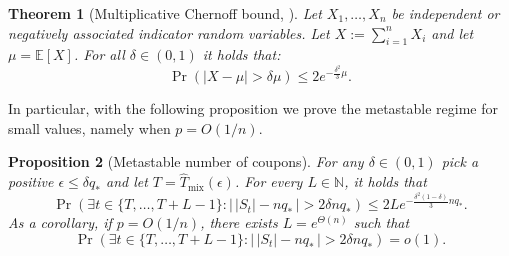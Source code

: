 \documentclass[11pt,a4paper]{article}
\newtheorem{theorem}{Theorem}
\newtheorem{proposition}[theorem]{Proposition}
\newcommand{\E}{\mathbb{E}}
\newcommand{\Tmar}{\hat{T}_{\mathrm{mix}}}
\begin{document}
\begin{theorem}[Multiplicative Chernoff bound, \cite{dubhashi2009concentration}]\label{thm:chernoff bound}
Let $X_1,\dots,X_n$ be independent or negatively associated indicator random variables. 
Let $X := \sum_{i=1}^{n} X_i$ and let $\mu = \E[X]$.
For all $\delta \in (0,1)$ it holds that:
\begin{equation*}
    \Pr(|X - \mu| > \delta\mu) \le 2e^{-\frac{\delta^2}{3}\mu}.
\end{equation*}
\end{theorem}

In particular, with the following proposition we prove the metastable regime for small values, namely when $p=O(1/n)$.

\begin{proposition}[Metastable number of coupons]\label{prop:metastability}
For any $\delta \in (0,1)$ pick a positive $\epsilon \le \delta q_*$ and let $T = \Tmar(\epsilon)$. 
For every $L \in \mathbb{N}$, it holds that
\[
    \Pr\left(\exists t \in \{T,\ldots,T + L-1\} : \big|\, |S_t| - nq_* \,\big| > 2 \delta nq_* \right) 
    \le 2L e^{- \frac{\delta^2(1-\delta)}{3} nq_*}.
\]
As a corollary, if $p = O(1/n)$, there exists $L = e^{\Theta(n)}$ such that
\[
    \Pr\left(\exists t \in \{T,\ldots,T + L-1\} : \big|\, |S_t| - nq_* \,\big| > 2 \delta nq_* \right) = o(1).
\]
\end{proposition}
\end{document}
